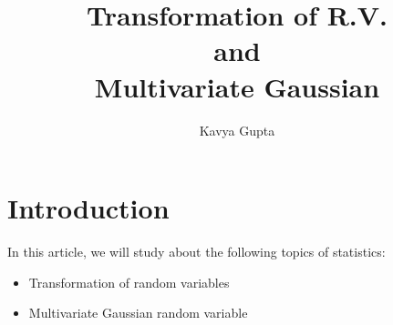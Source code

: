 \documentclass{article}
\begin{document}
\title{Transformation of R.V. \\ and \\ Multivariate Gaussian}
\author{Kavya Gupta}
\maketitle

\tableofcontents
\clearpage


\section{Introduction}
In this article, we will study about the following topics of statistics:
\begin{itemize}
    \item Transformation of random variables
    \item  Multivariate Gaussian random variable 
\end{itemize}


\end{document}
